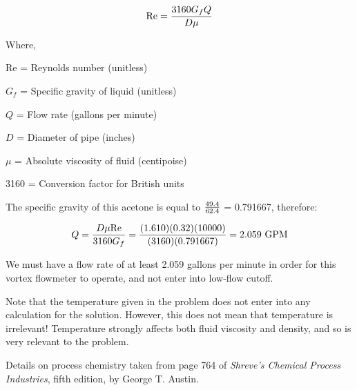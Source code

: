 












$$\hbox{Re} = {{3160 G_f Q} \over {D \mu}}$$

\noindent
Where,

Re = Reynolds number (unitless)

$G_f$ = Specific gravity of liquid (unitless)

$Q$ = Flow rate (gallons per minute)

$D$ = Diameter of pipe (inches)

$\mu$ = Absolute viscosity of fluid (centipoise)

3160 = Conversion factor for British units

\vskip 10pt

The specific gravity of this acetone is equal to $49.4 \over 62.4$ = 0.791667, therefore:

$$Q = {D \mu \hbox{Re} \over 3160 G_f} = {(1.610)(0.32)(10000) \over (3160)(0.791667)} = 2.059 \hbox{ GPM}$$

\vskip 10pt

We must have a flow rate of at least 2.059 gallons per minute in order for this vortex flowmeter to operate, and not enter into low-flow cutoff.

\vskip 10pt

Note that the temperature given in the problem does not enter into any calculation for the solution.  However, this does not mean that temperature is irrelevant!  Temperature strongly affects both fluid viscosity and density, and so is very relevant to the problem.

\vskip 10pt

Details on process chemistry taken from page 764 of {\it Shreve's Chemical Process Industries}, fifth edition, by George T. Austin.




